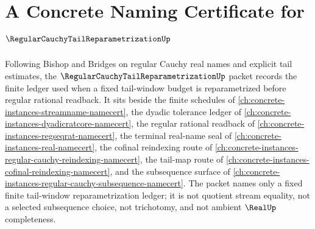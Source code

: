 \chapter{A Concrete Naming Certificate for $\RegularCauchyTailReparametrizationUp$}
\label{ch:concrete-instances-regular-cauchy-tail-reparametrization-namecert}

Following Bishop and Bridges on regular Cauchy real names and explicit tail estimates, the $\RegularCauchyTailReparametrizationUp$ packet records the finite ledger used when a fixed tail-window budget is reparametrized before regular rational readback. It sits beside the finite schedules of \autoref{ch:concrete-instances-streamname-namecert}, the dyadic tolerance ledger of \autoref{ch:concrete-instances-dyadicratcore-namecert}, the regular rational readback of \autoref{ch:concrete-instances-regseqrat-namecert}, the terminal real-name seal of \autoref{ch:concrete-instances-real-namecert}, the cofinal reindexing route of \autoref{ch:concrete-instances-regular-cauchy-reindexing-namecert}, the tail-map route of \autoref{ch:concrete-instances-cofinal-reindexing-namecert}, and the subsequence surface of \autoref{ch:concrete-instances-regular-cauchy-subsequence-namecert}. The packet names only a fixed finite tail-window reparametrization ledger; it is not quotient stream equality, not a selected subsequence choice, not trichotomy, and not ambient $\RealUp$ completeness.

